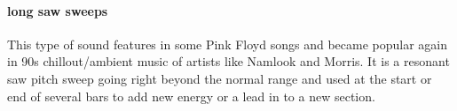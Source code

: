\paragraph{long saw sweeps}
This type of sound features in some Pink Floyd songs and became 
popular again in 90s chillout/ambient music of artists like
Namlook and Morris. It is a resonant saw pitch sweep going
right beyond the normal range and used at the start or end
of several bars to add new energy or a lead in to a new section.

 